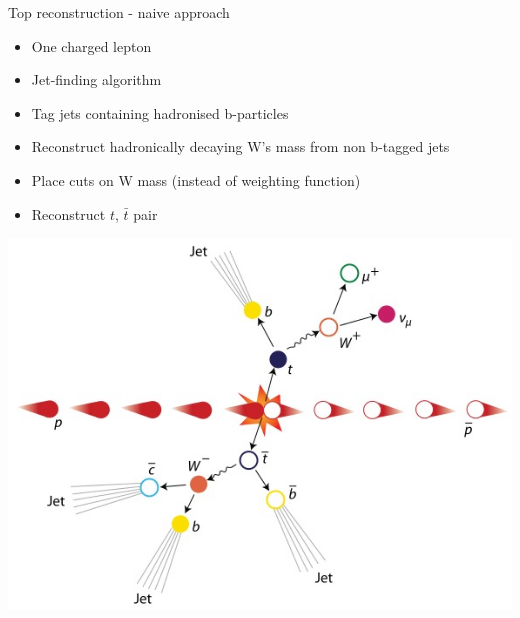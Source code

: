 \documentclass{beamer}
\begin{document}
  \begin{frame}{Top reconstruction - naive approach}
    \begin{itemize}[<uncover@+>]
      \item One charged lepton
      \item Jet-finding algorithm
      \item Tag jets containing hadronised b-particles 
      \item Reconstruct hadronically decaying W's mass from non b-tagged jets
      \item Place cuts on W mass (instead of weighting function)
      \item Reconstruct $t$, $\bar{t}$ pair
    \end{itemize}
    \includegraphics[height=0.4\textheight]{ttbar.jpg}
  \end{frame}
\end{document}
